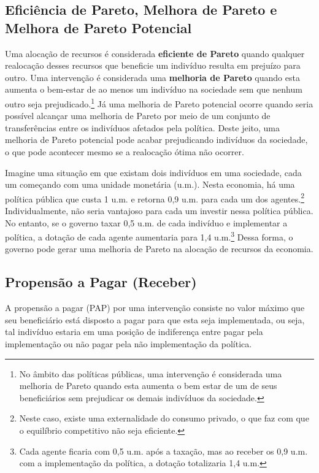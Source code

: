 \documentclass[12pt,letterpaper]{article}
\newcommand{\1}{\mathbbm{1}}
\numberwithin{equation}{section}
\begin{document}
\subsection{Eficiência de Pareto, Melhora de Pareto e Melhora de Pareto Potencial}

Uma alocação de recursos é considerada \textbf{eficiente de Pareto} quando qualquer realocação desses recursos que beneficie um indivíduo resulta em prejuízo para outro. Uma intervenção é considerada uma \textbf{melhoria de Pareto} quando esta aumenta o bem-estar de ao menos um indivíduo na sociedade sem que nenhum outro seja prejudicado.\footnote{No âmbito das políticas públicas, uma intervenção é considerada uma melhoria de Pareto quando esta aumenta o bem estar de um de seus beneficiários sem prejudicar os demais indivíduos da sociedade.} Já uma melhoria de Pareto potencial ocorre quando seria possível alcançar uma melhoria de Pareto por meio de um conjunto de transferências entre os indivíduos afetados pela política. Deste jeito, uma melhoria de Pareto potencial pode acabar prejudicando indivíduos da sociedade, o que pode acontecer mesmo se a realocação ótima não ocorrer.

Imagine uma situação em que existam dois indivíduos em uma sociedade, cada um começando com uma unidade monetária (u.m.). Nesta economia, há uma política pública que custa 1 u.m. e retorna 0,9 u.m. para cada um dos agentes.\footnote{Neste caso, existe uma externalidade do consumo privado, o que faz com que o equilíbrio competitivo não seja eficiente.} Individualmente, não seria vantajoso para cada um investir nessa política pública. No entanto, se o governo taxar 0,5 u.m. de cada indivíduo e implementar a política, a dotação de cada agente aumentaria para 1,4 u.m.\footnote{Cada agente ficaria com 0,5 u.m. após a taxação, mas ao receber os 0,9 u.m. com a implementação da política, a dotação totalizaria 1,4 u.m.} Dessa forma, o governo pode gerar uma melhoria de Pareto na alocação de recursos da economia.

\subsection{Propensão a Pagar (Receber)}

A propensão a pagar (PAP) por uma intervenção consiste no valor máximo que seu beneficiário está disposto a pagar para que esta seja implementada, ou seja, tal indivíduo estaria em uma posição de indiferença entre pagar pela implementação ou não pagar pela não implementação da política.
\end{document}
